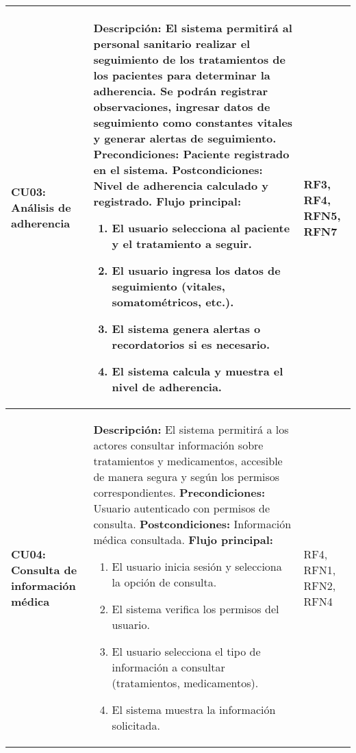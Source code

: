\begin{longtable}{|p{3cm}|p{9cm}|p{2cm}|}
	\textbf{CU03: Análisis de adherencia} & 
	\textbf{Descripción:} El sistema permitirá al personal sanitario realizar el seguimiento de los tratamientos de los pacientes para determinar la adherencia. Se podrán registrar observaciones, ingresar datos de seguimiento como constantes vitales y generar alertas de seguimiento.
	\newline \textbf{Precondiciones:} Paciente registrado en el sistema.
	\newline \textbf{Postcondiciones:} Nivel de adherencia calculado y registrado.
	\newline \textbf{Flujo principal:}
	\begin{enumerate}
		\item El usuario selecciona al paciente y el tratamiento a seguir.
		\item El usuario ingresa los datos de seguimiento (vitales, somatométricos, etc.).
		\item El sistema genera alertas o recordatorios si es necesario.
		\item El sistema calcula y muestra el nivel de adherencia.
	\end{enumerate}
	& RF3, RF4, RFN5, RFN7 \\
	\hline
	
	\textbf{CU04: Consulta de información médica} & 
	\textbf{Descripción:} El sistema permitirá a los actores consultar información sobre tratamientos y medicamentos, accesible de manera segura y según los permisos correspondientes.
	\newline \textbf{Precondiciones:} Usuario autenticado con permisos de consulta.
	\newline \textbf{Postcondiciones:} Información médica consultada.
	\newline \textbf{Flujo principal:}
	\begin{enumerate}
		\item El usuario inicia sesión y selecciona la opción de consulta.
		\item El sistema verifica los permisos del usuario.
		\item El usuario selecciona el tipo de información a consultar (tratamientos, medicamentos).
		\item El sistema muestra la información solicitada.
	\end{enumerate}
	& RF4, RFN1, RFN2, RFN4 \\
	\hline
	

\end{longtable}
